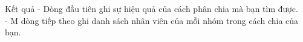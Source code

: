 Kết quả  
- Dòng đầu tiên ghi sự hiệu quả của cách phân chia mà bạn tìm được.   
\\   - M dòng tiếp theo ghi danh sách nhân viên của mỗi nhóm trong cách chia của bạn.